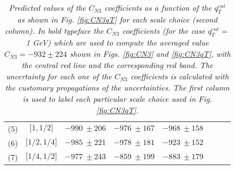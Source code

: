 \documentclass[12pt]{article}
\begin{document}
\begin{table}
\begin{tabular}{ |c|c||c|c|c|c|c|c| }
\multirow{1}{*}{(5)} 

& $\big[1,1/2 \big]$

& $ -990~\pm 206$ %

& $ -976~\pm 167$%

& $ -968~\pm 158$%

 \\
 
\multirow{1}{*}{(6)} 

& $ \big[1/2,1/4 \big]$

& $ -985~\pm 221$ %

& $ -978~\pm 181$%

& $-923~\pm 152$%

\\

\multirow{1}{*}{(7)} 

& $\big[1/4,1/2 \big]$

& $ -977~\pm 243$ %

& $ -859~\pm 199$%

& $ -883~\pm 179$%
\\

\hline

\end{tabular}

\caption{\label{Table:CN3values}
{\em Predicted values of the $C_{N3}$ coefficients as a function of the $q^{cut}_{T}$ as shown in Fig. \ref{fig:CN3qT} for each scale choice (second column). In bold typeface the $C_{N3}$ coefficients (for the case $q^{cut}_{T}=$1 GeV) which are used to compute the averaged value $C_{N3}=-932\pm 224$ shown in Figs. \ref{fig:CN3} and \ref{fig:CN3qT}, with the central red line and the corresponding red band. The uncertainty for each one of the $C_{N3}$ coefficients is calculated with the customary propagations of the uncertainties. The first column is used to label each particular scale choice used in Fig. \ref{fig:CN3qT}.
}
}
\renewcommand{\arraystretch}{1}

\end{table}
\end{document}
